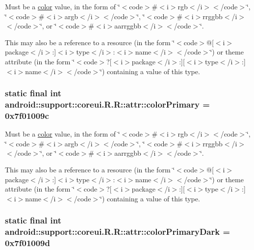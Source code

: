 Must be a \hyperlink{classandroid_1_1support_1_1coreui_1_1_r_1_1color}{color} value, in the form of \char`\"{}$<$code$>$\#$<$i$>$rgb$<$/i$>$$<$/code$>$\char`\"{}, \char`\"{}$<$code$>$\#$<$i$>$argb$<$/i$>$$<$/code$>$\char`\"{}, \char`\"{}$<$code$>$\#$<$i$>$rrggbb$<$/i$>$$<$/code$>$\char`\"{}, or \char`\"{}$<$code$>$\#$<$i$>$aarrggbb$<$/i$>$$<$/code$>$\char`\"{}. 

This may also be a reference to a resource (in the form \char`\"{}$<$code$>$@\mbox{[}$<$i$>$package$<$/i$>$:\mbox{]}$<$i$>$type$<$/i$>$:$<$i$>$name$<$/i$>$$<$/code$>$\char`\"{}) or theme attribute (in the form \char`\"{}$<$code$>$?\mbox{[}$<$i$>$package$<$/i$>$:\mbox{]}\mbox{[}$<$i$>$type$<$/i$>$:\mbox{]}$<$i$>$name$<$/i$>$$<$/code$>$\char`\"{}) containing a value of this type. \hypertarget{classandroid_1_1support_1_1coreui_1_1_r_1_1attr_2892164f86da7e75926a8a7ad05579a9}{
\subsubsection[{colorPrimary}]{\setlength{\rightskip}{0pt plus 5cm}static final int android::support::coreui.R.R::attr::colorPrimary = 0x7f01009c}}
\label{classandroid_1_1support_1_1coreui_1_1_r_1_1attr_2892164f86da7e75926a8a7ad05579a9}


Must be a \hyperlink{classandroid_1_1support_1_1coreui_1_1_r_1_1color}{color} value, in the form of \char`\"{}$<$code$>$\#$<$i$>$rgb$<$/i$>$$<$/code$>$\char`\"{}, \char`\"{}$<$code$>$\#$<$i$>$argb$<$/i$>$$<$/code$>$\char`\"{}, \char`\"{}$<$code$>$\#$<$i$>$rrggbb$<$/i$>$$<$/code$>$\char`\"{}, or \char`\"{}$<$code$>$\#$<$i$>$aarrggbb$<$/i$>$$<$/code$>$\char`\"{}. 

This may also be a reference to a resource (in the form \char`\"{}$<$code$>$@\mbox{[}$<$i$>$package$<$/i$>$:\mbox{]}$<$i$>$type$<$/i$>$:$<$i$>$name$<$/i$>$$<$/code$>$\char`\"{}) or theme attribute (in the form \char`\"{}$<$code$>$?\mbox{[}$<$i$>$package$<$/i$>$:\mbox{]}\mbox{[}$<$i$>$type$<$/i$>$:\mbox{]}$<$i$>$name$<$/i$>$$<$/code$>$\char`\"{}) containing a value of this type. \hypertarget{classandroid_1_1support_1_1coreui_1_1_r_1_1attr_68a1221eba3766c9d34ca9c95be2b9fb}{
\subsubsection[{colorPrimaryDark}]{\setlength{\rightskip}{0pt plus 5cm}static final int android::support::coreui.R.R::attr::colorPrimaryDark = 0x7f01009d}}
\label{classandroid_1_1support_1_1coreui_1_1_r_1_1attr_68a1221eba3766c9d34ca9c95be2b9fb}


